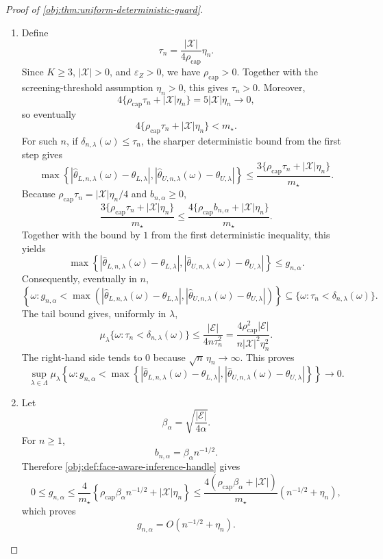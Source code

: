 \begin{proof}[Proof of \cref{obj:thm:uniform-deterministic-guard}]
\begin{enumerate}
\item Define
\[
\tau_n
=
\frac{|\mathcal X|}{4\rho_{\mathrm{cap}}}\eta_n .
\]
Since \(K\ge3\), \(|\mathcal X|>0\), and \(\varepsilon_Z>0\), we have
\(\rho_{\mathrm{cap}}>0\).  Together with the screening-threshold assumption
\(\eta_n>0\), this gives \(\tau_n>0\).  Moreover,
\[
4\{\rho_{\mathrm{cap}}\tau_n+|\mathcal X|\eta_n\}
=
5|\mathcal X|\eta_n
\longrightarrow 0,
\]
so eventually
\[
4\{\rho_{\mathrm{cap}}\tau_n+|\mathcal X|\eta_n\}<m_\star .
\]
For such \(n\), if
\(\delta_{n,\lambda}(\omega)\le\tau_n\), the sharper deterministic bound from
the first step gives
\[
\max\left\{
\left|\widehat\theta_{L,n,\lambda}(\omega)-\theta_{L,\lambda}\right|,
\left|\widehat\theta_{U,n,\lambda}(\omega)-\theta_{U,\lambda}\right|
\right\}
\le
\frac{3\{\rho_{\mathrm{cap}}\tau_n+|\mathcal X|\eta_n\}}{m_\star}.
\]
Because \(\rho_{\mathrm{cap}}\tau_n=|\mathcal X|\eta_n/4\) and
\(b_{n,\alpha}\ge0\),
\[
\frac{3\{\rho_{\mathrm{cap}}\tau_n+|\mathcal X|\eta_n\}}{m_\star}
\le
\frac{4\{\rho_{\mathrm{cap}}b_{n,\alpha}+|\mathcal X|\eta_n\}}{m_\star}.
\]
Together with the bound by \(1\) from the first deterministic inequality, this
yields
\[
\max\left\{
\left|\widehat\theta_{L,n,\lambda}(\omega)-\theta_{L,\lambda}\right|,
\left|\widehat\theta_{U,n,\lambda}(\omega)-\theta_{U,\lambda}\right|
\right\}
\le
g_{n,\alpha}.
\]
Consequently, eventually in \(n\),
\[
\left\{\omega:
g_{n,\alpha}
<
\max\left(
\left|\widehat\theta_{L,n,\lambda}(\omega)-\theta_{L,\lambda}\right|,
\left|\widehat\theta_{U,n,\lambda}(\omega)-\theta_{U,\lambda}\right|
\right)
\right\}
\subseteq
\{\omega:\tau_n<\delta_{n,\lambda}(\omega)\}.
\]
The tail bound gives, uniformly in \(\lambda\),
\[
\mu_\lambda\{\omega:\tau_n<\delta_{n,\lambda}(\omega)\}
\le
\frac{|\mathcal E|}{4n\tau_n^2}
=
\frac{4\rho_{\mathrm{cap}}^2|\mathcal E|}
{n|\mathcal X|^2\eta_n^2}.
\]
The right-hand side tends to \(0\) because
\(\sqrt n\,\eta_n\to\infty\).
This proves
\[
\sup_{\lambda\in\Lambda}
\mu_\lambda\!\left\{
\omega:
g_{n,\alpha}
<
\max\left\{
\left|\widehat\theta_{L,n,\lambda}(\omega)-\theta_{L,\lambda}\right|,
\left|\widehat\theta_{U,n,\lambda}(\omega)-\theta_{U,\lambda}\right|
\right\}
\right\}
\longrightarrow 0 .
\]

\item Let
\[
\beta_\alpha
=
\sqrt{\frac{|\mathcal E|}{4\alpha}} .
\]
For \(n\ge1\),
\[
b_{n,\alpha}=\beta_\alpha n^{-1/2}.
\]
Therefore \cref{obj:def:face-aware-inference-handle} gives
\[
0\le g_{n,\alpha}
\le
\frac{4}{m_\star}
\left\{
\rho_{\mathrm{cap}}\beta_\alpha n^{-1/2}
+
|\mathcal X|\eta_n
\right\}
\le
\frac{4(\rho_{\mathrm{cap}}\beta_\alpha+|\mathcal X|)}{m_\star}
\left(n^{-1/2}+\eta_n\right),
\]
which proves
\[
g_{n,\alpha}=O(n^{-1/2}+\eta_n).
\]


\end{enumerate}
\end{proof}
